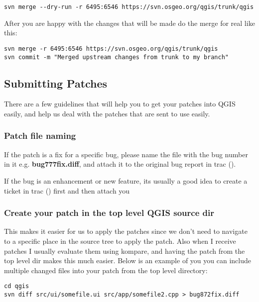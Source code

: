 \begin{verbatim}
svn merge --dry-run -r 6495:6546 https://svn.osgeo.org/qgis/trunk/qgis
\end{verbatim}

After you are happy with the changes that will be made do the merge for real like this:

\begin{verbatim}
svn merge -r 6495:6546 https://svn.osgeo.org/qgis/trunk/qgis
svn commit -m "Merged upstream changes from trunk to my branch"
\end{verbatim}

\subsection{Submitting Patches}
There are a few guidelines that will help you to get your patches into QGIS easily, and help us 
deal with the patches that are sent to use easily.

\subsubsection{Patch file naming}
If the patch is a fix for a specific bug, please name the file with the bug number in it e.g. 
\textbf{bug777fix.diff}, and attach it to the original bug report in trac ().

If the bug is an enhancement or new feature, its usually a good idea to create a ticket in 
trac () first and then attach you 

\subsubsection{Create your patch in the top level QGIS source dir}
This makes it easier for us to apply the patches since we don't need to navigate to a specific 
place in the source tree to apply the patch. Also when I receive patches I usually evaluate them 
using kompare, and having the patch from the top level dir makes this much easier. Below is an 
example of you you can include multiple changed files into your patch from the top level directory:

\begin{verbatim}
cd qgis
svn diff src/ui/somefile.ui src/app/somefile2.cpp > bug872fix.diff
\end{verbatim}

